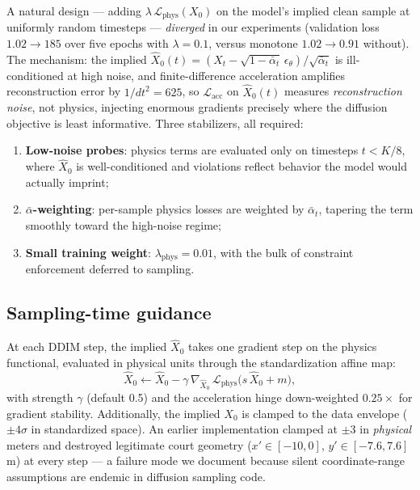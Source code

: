 \documentclass[11pt]{article}
\newcommand{\loss}{\mathcal{L}}
\begin{document}
A natural design --- adding $\lambda \, \loss_{\text{phys}}(X_0)$ on the
model's implied clean sample at uniformly random timesteps --- \emph{diverged}
in our experiments (validation loss $1.02 \rightarrow 185$ over five epochs
with $\lambda{=}0.1$, versus monotone $1.02 \rightarrow 0.91$ without). The
mechanism: the implied $\hat X_0(t) = (X_t - \sqrt{1 - \bar\alpha_t}\,
\epsilon_\theta) / \sqrt{\bar\alpha_t}$ is ill-conditioned at high noise,
and finite-difference acceleration amplifies reconstruction error by
$1/dt^2 = 625$, so $\loss_{\text{acc}}$ on $\hat X_0(t)$ measures
\emph{reconstruction noise}, not physics, injecting enormous gradients
precisely where the diffusion objective is least informative. Three
stabilizers, all required:
\begin{enumerate}[leftmargin=*,itemsep=1pt]
\item \textbf{Low-noise probes}: physics terms are evaluated only on timesteps
  $t < K/8$, where $\hat X_0$ is well-conditioned and violations reflect
  behavior the model would actually imprint;
\item \textbf{$\bar\alpha$-weighting}: per-sample physics losses are weighted
  by $\bar\alpha_t$, tapering the term smoothly toward the high-noise regime;
\item \textbf{Small training weight}: $\lambda_{\text{phys}} = 0.01$, with the
  bulk of constraint enforcement deferred to sampling.
\end{enumerate}

\subsection{Sampling-time guidance}
\label{sec:guidance}

At each DDIM step, the implied $\hat X_0$ takes one gradient step on the
physics functional, evaluated in physical units through the standardization
affine map:
\begin{equation}
\hat X_0 \leftarrow \hat X_0 - \gamma\, \nabla_{\hat X_0}\,
\loss_{\text{phys}}\!\big( s\, \hat X_0 + m \big),
\label{eq:guidance}
\end{equation}
with strength $\gamma$ (default 0.5) and the acceleration hinge down-weighted
$0.25\times$ for gradient stability. Additionally, the implied $X_0$ is
clamped to the data envelope ($\pm 4\sigma$ in standardized space). An
earlier implementation clamped at $\pm 3$ in \emph{physical} meters and
destroyed legitimate court geometry ($x' \in [-10, 0]$, $y' \in [-7.6,
7.6]$\,m) at every step --- a failure mode we document because silent
coordinate-range assumptions are endemic in diffusion sampling code.
\end{document}
